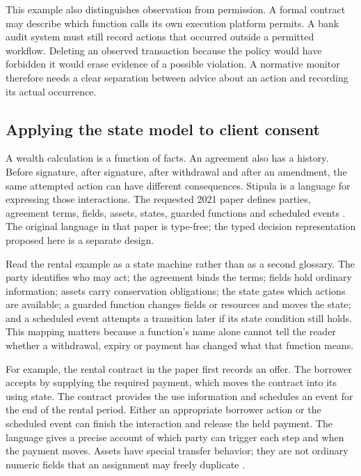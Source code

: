 This example also distinguishes observation from permission. A formal contract
may describe which function calls its own execution platform permits. A bank
audit system must still record actions that occurred outside a permitted
workflow. Deleting an observed transaction because the policy would have
forbidden it would erase evidence of a possible violation. A normative monitor
therefore needs a clear separation between advice about an action and recording
its actual occurrence.

\subsection{Applying the state model to client consent}
\label{merge:P-01a-language-lesson:03}

\label{sec:stipula-tutorial}

A wealth calculation is a function of facts. An agreement also has a history.
Before signature, after signature, after withdrawal and after an amendment, the
same attempted action can have different consequences. Stipula is a language
for expressing those interactions. The requested 2021 paper defines parties,
agreement terms, fields, assets, states, guarded functions and scheduled events
\citep[secs.~3--4]{stipula2021}. The original language in that paper is
type-free; the typed decision representation proposed here is a separate design.

Read the rental example as a state machine rather than as a second glossary.
The party identifies who may act; the agreement binds the terms; fields hold
ordinary information; assets carry conservation obligations; the state gates
which actions are available; a guarded function changes fields or resources and
moves the state; and a scheduled event attempts a transition later if its state
condition still holds. This mapping matters because a function's name alone
cannot tell the reader whether a withdrawal, expiry or payment has changed what
that function means.

For example, the rental contract in the paper first records an offer. The
borrower accepts by supplying the required payment, which moves the contract
into its using state. The contract provides the use information and schedules
an event for the end of the rental period. Either an appropriate borrower action
or the scheduled event can finish the interaction and release the held payment.
The language gives a precise account of which party can trigger each step and
when the payment moves. Assets have special transfer behavior; they are not
ordinary numeric fields that an assignment may freely duplicate
\citep[sec.~3, rental example and grammar]{stipula2021}.

